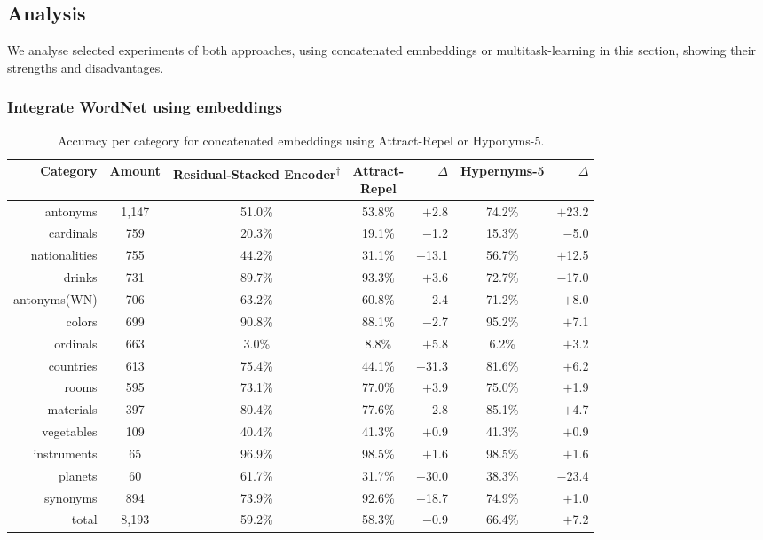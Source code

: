 \subsection{Analysis}
We analyse selected experiments of both approaches, using concatenated emnbeddings or multitask-learning in this section, showing their strengths and disadvantages.

\subsubsection{Integrate WordNet using embeddings}
\begin{table}[tph!]
\centering
\begin{tabular}{rcc|cr|cr}
\textbf{Category}  & \textbf{Amount}& \specialcellc{\textbf{Residual-Stacked}\\\textbf{Encoder}\textsuperscript{$\dagger$}} & \specialcellc{\textbf{Attract-}\\\textbf{Repel}} & $\Delta$ &  \textbf{Hypernyms-5} & $\Delta$ \\
\toprule
antonyms & 1,147 & 51.0\% & 53.8\% & $+$2.8 & 74.2\% & $+$23.2 \\
cardinals & 759 & 20.3\% & 19.1\% & $-$1.2 & 15.3\% & $-$5.0 \\
nationalities & 755 & 44.2\% & 31.1\% & $-$13.1 & 56.7\% & $+$12.5 \\
drinks & 731 & 89.7\% & 93.3\% & $+$3.6 & 72.7\% & $-$17.0 \\
antonyms(WN) & 706 & 63.2\% & 60.8\% & $-$2.4 & 71.2\% & $+$8.0 \\
colors & 699 & 90.8\% & 88.1\% & $-$2.7 & 95.2\% & $+$7.1 \\
ordinals & 663 & 3.0\% & 8.8\% & $+$5.8 & 6.2\% & $+$3.2 \\
countries & 613 & 75.4\% & 44.1\% & $-$31.3 & 81.6\% & $+$6.2 \\
rooms & 595 & 73.1\% & 77.0\% & $+$3.9 & 75.0\% & $+$1.9\\
materials & 397 & 80.4\% & 77.6\% & $-$2.8 & 85.1\% & $+$4.7 \\
vegetables & 109 & 40.4\% & 41.3\% & $+$0.9 & 41.3\% & $+$0.9 \\
instruments & 65 & 96.9\% & 98.5\% & $+$1.6 & 98.5\% & $+$1.6 \\
planets & 60 & 61.7\% & 31.7\% & $-$30.0 & 38.3\% & $-$23.4 \\
\midrule
synonyms & 894 & 73.9\% & 92.6\% & $+$18.7 & 74.9\% & $+$1.0 \\
\midrule
total & 8,193 & 59.2\% & 58.3\% & $-$0.9 & 66.4\% & $+$7.2 \\
\bottomrule
\end{tabular}
\caption{Accuracy per category for concatenated embeddings using Attract-Repel or Hyponyms-5.}
\label{tab:detail_added_embds}
\end{table}
